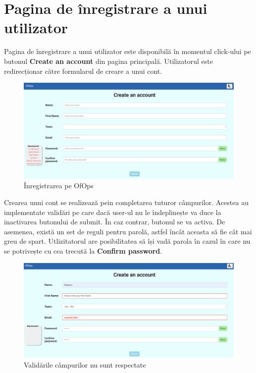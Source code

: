 \section{Pagina de înregistrare a unui utilizator}

Pagina de înregistrare a unui utilizator este disponibilă în momentul click-ului pe butonul \textbf{Create an account} din pagina principală. Utilizatorul este redirecționar către formularul de creare a unui cont.  

\begin{figure}[!htb]
    \centering
    \includegraphics[width=0.9\linewidth]{images/inregistrare.png}
    \caption{Înregistrarea pe OfOps}
    \label{fig:inregistrare}
\end{figure}

Crearea unui cont se realizează pein completarea tuturor câmpurilor. Acestea au implementate validări pe care dacă user-ul nu le îndeplinește va duce la inactivarea butonului de submit. În caz contrar, butonul se va activa. De asemenea, există un set de reguli pentru parolă, astfel încât aceasta să fie cât mai greu de spart. Utlizitatorul are posibilitatea să își vadă parola în cazul în care nu se potrivește cu cea trecută la \textbf{Confirm password}.

\newpage

\begin{figure}[!htb]
    \centering
    \includegraphics[width=0.9\linewidth]{images/greseli.png}
    \caption{Validările câmpurilor nu sunt respectate}
    \label{fig:greseli}
\end{figure}

